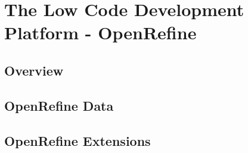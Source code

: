 \chapter{The Low Code Development Platform - OpenRefine}
\section{Overview}
\lipsum[3-6]
\section{OpenRefine Data}
\lipsum[7-10]
\section{OpenRefine Extensions}
\lipsum[11-14]